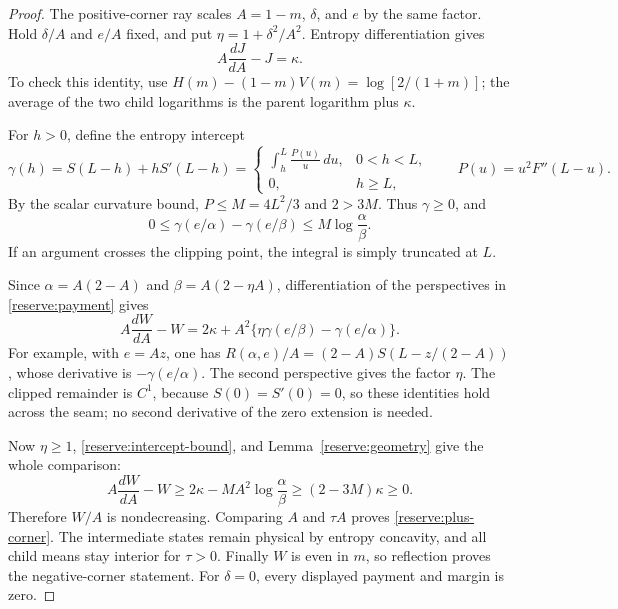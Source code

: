 \begin{proof}
The positive-corner ray scales $A=1-m$, $\delta$, and $e$ by
the same factor.  Hold $\delta/A$ and $e/A$ fixed, and put
$\eta=1+\delta^2/A^2$.  Entropy differentiation gives
\begin{equation}
 A\frac{dJ}{dA}-J=\kappa.
 \label{reserve:entropy-euler}
\end{equation}
To check this identity, use
$H(m)-(1-m)V(m)=\log[2/(1+m)]$; the average of the two
child logarithms is the parent logarithm plus $\kappa$.

For $h>0$, define the entropy intercept
\[
 \gamma(h)=S(L-h)+hS'(L-h)
 =\begin{cases}
 \displaystyle\int_h^L\frac{P(u)}u\,du,&0<h<L,\\
 0,&h\ge L,
 \end{cases}
 \qquad P(u)=u^2F''(L-u).
\]
By the scalar curvature bound, $P\le M=4L^2/3$ and $2>3M$.
Thus $\gamma\ge0$, and
\begin{equation}
 0\le\gamma(e/\alpha)-\gamma(e/\beta)
 \le M\log\frac\alpha\beta.
 \label{reserve:intercept-bound}
\end{equation}
If an argument crosses the clipping point, the integral is simply
truncated at $L$.

Since $\alpha=A(2-A)$ and $\beta=A(2-\eta A)$, differentiation
of the perspectives in \eqref{reserve:payment} gives
\begin{equation}
 A\frac{dW}{dA}-W
 =2\kappa+A^2\{\eta\gamma(e/\beta)-\gamma(e/\alpha)\}.
 \label{reserve:euler}
\end{equation}
For example, with $e=Az$, one has
$R(\alpha,e)/A=(2-A)S(L-z/(2-A))$, whose derivative is
$-\gamma(e/\alpha)$.  The second perspective gives the factor
$\eta$.  The clipped remainder is $C^1$, because $S(0)=S'(0)=0$,
so these identities hold across the seam; no second derivative of
the zero extension is needed.

Now $\eta\ge1$, \eqref{reserve:intercept-bound}, and
Lemma~\ref{reserve:geometry} give the whole comparison:
\begin{equation}
 A\frac{dW}{dA}-W
 \ge2\kappa-MA^2\log\frac\alpha\beta
 \ge(2-3M)\kappa\ge0.
 \label{reserve:corner-margin}
\end{equation}
Therefore $W/A$ is nondecreasing.  Comparing $A$ and $\tau A$
proves \eqref{reserve:plus-corner}.  The intermediate states remain
physical by entropy concavity, and all child means stay interior for
$\tau>0$.  Finally $W$ is even in $m$, so reflection proves the
negative-corner statement.  For $\delta=0$, every displayed payment
and margin is zero.
\end{proof}

